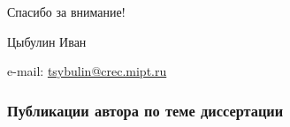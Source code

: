 \documentclass[unicode,aspectratio=43]{beamer}
\newcommand{\colorhref}[2]{\href{#1}{\textcolor{miptbase!30!black}{#2}}}
\begin{document}
\begin{frame}[plain]
  \begin{center}
  {\Huge Спасибо за внимание!}
  \vspace{8ex}

  Цыбулин Иван

  e-mail: \colorhref{mailto:tsybulin@crec.mipt.ru}{tsybulin@crec.mipt.ru}
  \end{center}
\end{frame}

\begin{frame}[allowframebreaks]\frametitle{Публикации автора по теме диссертации}
\nocite{*}
\tiny
\insertbiblioauthor
\end{frame}
\end{document}
